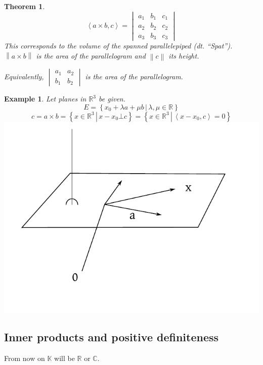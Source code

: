 \documentclass{article}
\newtheorem{theorem}{Theorem}  \numberwithin{theorem}{section}
\newtheorem{example}{Example}  \numberwithin{example}{section}
\newcommand{\setdef}[2]{\left\{\left.#1\,\right|\,#2\right\}}
\newcommand{\angel}[1]{\left\langle#1\right\rangle}
\newcommand{\norm}[1]{\left\|#1\right\|}
\begin{document}
\begin{theorem} %
  \[ \angel{a \times b, c} = \begin{vmatrix} a_1 & b_1 & c_1 \\ a_2 & b_2 & c_2 \\ a_3 & b_3 & c_3 \end{vmatrix} \]
  This corresponds to the volume of the spanned parallelepiped (dt. \foreignlanguage{german}{\enquote{Spat}}).
  $\norm{a \times b}$ is the area of the parallelogram and $\norm{c}$ its height.

  Equivalently, $\begin{vmatrix} a_1 & a_2 \\ b_1 & b_2 \end{vmatrix}$ is the area of the parallelogram.
\end{theorem}

\begin{example} %
  Let planes in $\mathbb R^3$ be given.
  \[ E = \setdef{x_0 + \lambda a + \mu b}{\lambda, \mu \in \mathbb R} \]
  \[ c = a \times b = \setdef{x \in \mathbb R^3}{x - x_0 \bot c} = \setdef{x \in \mathbb R^3}{\angel{x - x_0, c} = 0} \]
  \includegraphics{img/05_application.pdf} %
\end{example}

\subsection{Inner products and positive definiteness}
From now on $\mathbb K$ will be $\mathbb R$ or $\mathbb C$.
\end{document}

